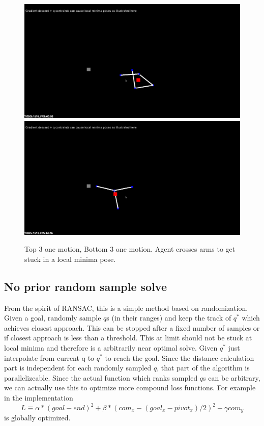 \documentclass[12pt]{article}
\begin{document}
\begin{figure}[!htb]
\endminipage\hfill
{}
\includegraphics[width=\linewidth]{figures/2.b.jpg}
\endminipage\hfill
{}%
\includegraphics[width=\linewidth]{figures/2.c.jpg}
\endminipage
\caption{Top 3 one motion, Bottom 3 one motion. Agent crosses arms to get stuck in a local minima pose.}
\label{fig:local_minima}
\end{figure}

\subsection{No prior random sample solve}
From the spirit of RANSAC, this is a simple method based on randomization.
Given a goal, randomly sample $q$s (in their ranges) and keep the track of $q^*$ which achieves closest approach.
This can be stopped after a fixed number of samples or if closest approach is less than a threshold.
This at limit should not be stuck at local minima and therefore is a arbitrarily near optimal solve.
Given $q^*$ just interpolate from current q to $q^*$ to reach the goal.
Since the distance calculation part is independent for each randomly sampled $q$, that part of the algorithm is parallelizeable.
Since the actual function which ranks sampled $q$s can be arbitrary, we can actually use this to optimize more compound loss functions.
For example in the implementation
\[
    L \equiv \alpha * (goal - end)^2 + \beta * (com_x - (goal_x - pivot_x) / 2)^2 + \gamma com_y
\]
is globally optimized.
\end{document}
